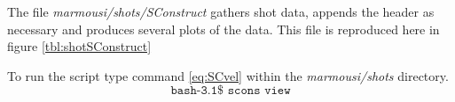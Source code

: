 The file \emph{marmousi/shots/SConstruct} gathers shot data, appends the header as necessary and produces several plots of the data.  This file is reproduced here in figure \ref{tbl:shotSConstruct}


{
\tiny

\normalsize
}


To run the script type command \ref{eq:SCvel} within the \emph{marmousi\slash shots} directory.
\begin{equation}\label{eq:SCvel} \texttt{bash-3.1\$\ scons\ view} \end{equation}

